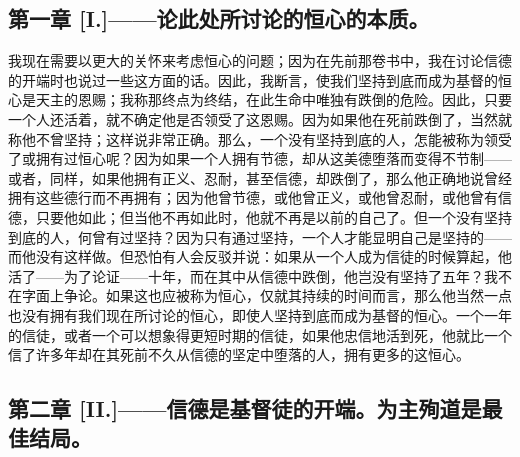 
\subsection{第一章 [I.]——论此处所讨论的恒心的本质。}

我现在需要以更大的关怀来考虑恒心的问题；因为在先前那卷书中，我在讨论信德的开端时也说过一些这方面的话。因此，我断言，使我们坚持到底而成为基督的恒心是天主的恩赐；我称那终点为终结，在此生命中唯独有跌倒的危险。因此，只要一个人还活着，就不确定他是否领受了这恩赐。因为如果他在死前跌倒了，当然就称他不曾坚持；这样说非常正确。那么，一个没有坚持到底的人，怎能被称为领受了或拥有过恒心呢？因为如果一个人拥有节德，却从这美德堕落而变得不节制——或者，同样，如果他拥有正义、忍耐，甚至信德，却跌倒了，那么他正确地说曾经拥有这些德行而不再拥有；因为他曾节德，或他曾正义，或他曾忍耐，或他曾有信德，只要他如此；但当他不再如此时，他就不再是以前的自己了。但一个没有坚持到底的人，何曾有过坚持？因为只有通过坚持，一个人才能显明自己是坚持的——而他没有这样做。但恐怕有人会反驳并说：如果从一个人成为信徒的时候算起，他活了——为了论证——十年，而在其中从信德中跌倒，他岂没有坚持了五年？我不在字面上争论。如果这也应被称为恒心，仅就其持续的时间而言，那么他当然一点也没有拥有我们现在所讨论的恒心，即使人坚持到底而成为基督的恒心。一个一年的信徒，或者一个可以想象得更短时期的信徒，如果他忠信地活到死，他就比一个信了许多年却在其死前不久从信德的坚定中堕落的人，拥有更多的这恒心。\par


\subsection{第二章 [II.]——信德是基督徒的开端。为主殉道是最佳结局。}

